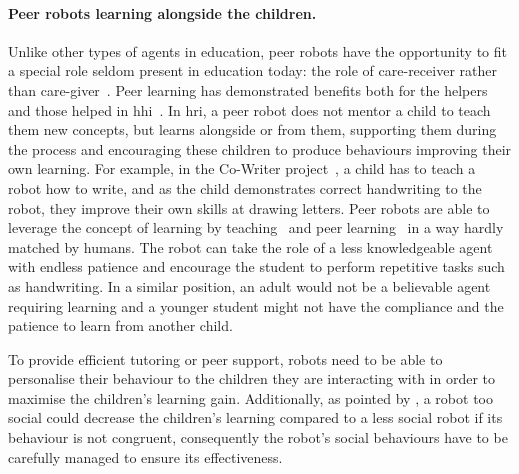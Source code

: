 	\paragraph{Peer robots learning alongside the children.}
	Unlike other types of agents in education, peer robots have the opportunity to fit a special role seldom present in education today: the role of care-receiver rather than care-giver~\citep{tanaka2012children}. Peer learning has demonstrated benefits both for the helpers and those helped in \gls{hhi}~\citep{topping2005trends}. In \gls{hri}, a peer robot does not mentor a child to teach them new concepts, but learns alongside or from them, supporting them during the process and encouraging these children to produce behaviours improving their own learning. For example, in the Co-Writer project~\citep{hood2015children}, a child has to teach a robot how to write, and as the child demonstrates correct handwriting to the robot, they improve their own skills at drawing letters. Peer robots are able to leverage the concept of learning by teaching~\citep{frager1970learning} and peer learning~\citep{topping2005trends} in a way hardly matched by humans. The robot can take the role of a less knowledgeable agent with endless patience and encourage the student to perform repetitive tasks such as handwriting. In a similar position, an adult would not be a believable agent requiring learning and a younger student might not have the compliance and the patience to learn from another child.
	
	To provide efficient tutoring or peer support, robots need to be able to personalise their behaviour to the children they are interacting with in order to maximise the children's learning gain. Additionally, as pointed by \citet{kennedy2015robot}, a robot too social could decrease the children's learning compared to a less social robot if its behaviour is not congruent, consequently the robot's social behaviours have to be carefully managed to ensure its effectiveness. 
	
